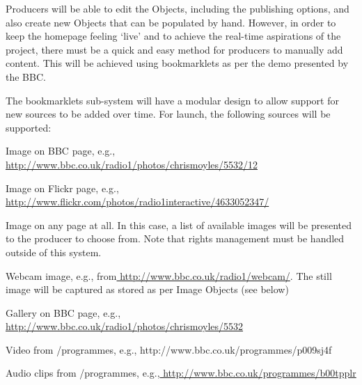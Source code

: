\documentclass[a4paper, 11pt]{scrreprt}
\begin{document}
Producers will be able to edit the Objects, including the publishing options, and also create new Objects that can be populated by hand. However, in order to keep the homepage feeling ‘live’ and to achieve the real-time aspirations of the project, there must be a quick and easy method for producers to manually add content. This will be achieved using bookmarklets as per the demo presented by the BBC.

The bookmarklets sub-system will have a modular design to allow support for new sources to be added over time. For launch, the following sources will be supported:



\begin{tystrul}


\item Image on BBC page, e.g.,\href{http://www.google.com/url?q=http%3A%2F%2Fwww.bbc.co.uk%2Fradio1%2Fphotos%2Fchrismoyles%2F5532%2F12&sa=D&sntz=1&usg=AFQjCNHn9WqOWgalTpkeue8WHCbTMrsyGA}{ http://www.bbc.co.uk/radio1/photos/chrismoyles/5532/12}

\item Image on Flickr page, e.g.,\href{http://www.google.com/url?q=http%3A%2F%2Fwww.flickr.com%2Fphotos%2Fradio1interactive%2F4633052347%2F&sa=D&sntz=1&usg=AFQjCNEIi1bYKbl7wETgg-zPbiwvpdLD4Q}{ http://www.flickr.com/photos/radio1interactive/4633052347/}

\item Image on any page at all. In this case, a list of available images will be presented to the producer to choose from. Note that rights management must be handled outside of this system.

\item Webcam image, e.g., from\href{http://www.google.com/url?q=http%3A%2F%2Fwww.bbc.co.uk%2Fradio1%2Fwebcam%2F&sa=D&sntz=1&usg=AFQjCNGI2M_3lazHiE59sQ_Pz6mPrwceMg}{ http://www.bbc.co.uk/radio1/webcam/}. The still image will be captured as stored as per Image Objects (see below)

\item Gallery on BBC page, e.g.,\href{http://www.google.com/url?q=http%3A%2F%2Fwww.bbc.co.uk%2Fradio1%2Fphotos%2Fchrismoyles%2F5532&sa=D&sntz=1&usg=AFQjCNGzVw031QNob9HFXZrdARKtsxA4pQ}{ http://www.bbc.co.uk/radio1/photos/chrismoyles/5532}

\item Video from /programmes, e.g., http://www.bbc.co.uk/programmes/p009sj4f

\item Audio clips from /programmes, e.g.,\href{http://www.google.com/url?q=http%3A%2F%2Fwww.bbc.co.uk%2Fprogrammes%2Fb00tpplr&sa=D&sntz=1&usg=AFQjCNECYI7w6bja_WDIT6ReGDaifkmNGA}{ http://www.bbc.co.uk/programmes/b00tpplr}


\end{tystrul}
\end{document}
